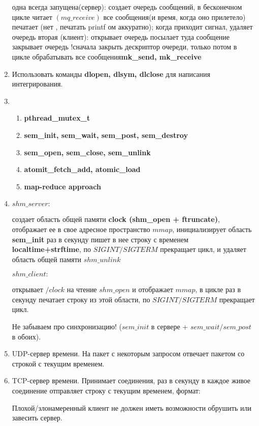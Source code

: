 \begin{enumerate}
одна всегда запущена(сервер):
    создает очередь сообщений, 
    в бесконечном цикле читает $(mq\_receive)$ все сообщения(и время, когда оно прилетело)
    печатает (нет \0, печатать printf ом аккуратно); 
    когда приходит сигнал, удаляет очередь
вторая (клиент):
    открывает очередь
    посылает туда сообщение
    закрывает очередь
!сначала закрыть дескриптор очереди, только потом в цикле обрабатывать все сообщения\textbf{mk\_send, mk\_receive} 
    \item Использовать команды \textbf{dlopen, dlsym, dlclose} для написания интегрирования. 
    \item 
        \begin{enumerate}
            \item \textbf{pthread\_mutex\_t} 
            \item \textbf{sem\_init, sem\_wait, sem\_post, sem\_destroy} 
            \item \textbf{sem\_open, sem\_close, sem\_unlink}
            \item \textbf{atomit\_fetch\_add, atomic\_load}
            \item \textbf{map-reduce approach} 
        \end{enumerate}
    \item $shm\_server:$ 
    
    создает область общей памяти \textbf{clock (shm\_open + ftruncate)}, отображает ее в свое адресное пространство $mmap$, инициализирует область \textbf{sem\_init} 
    раз в секунду пишет в нее строку с временем \textbf{localtime+strftime}, 
    по $SIGINT/SIGTERM$  прекращает цикл, и удаляет область общей памяти $shm\_unlink$
    
    $shm\_client:$ 
    
    открывает $/clock$ на чтение $shm\_open$ и отображает $mmap$, в цикле раз в секунду печатает строку из этой области, по $SIGINT/SIGTERM$ прекращает цикл. 
    
    Не забываем про синхронизацию! ($sem\_init$ в сервере + $sem\_wait/sem\_post$ в обоих).
    
    \item  UDP-сервер времени.
На пакет с некоторым запросом отвечает пакетом со строкой с текущим временем.  

    \item  TCP-сервер времени.
Принимает соединения, раз в секунду в каждое живое соединение отправляет
строку с текущим временем, формат: %

Плохой/злонамеренный клиент не должен иметь возможности обрушить или завесить сервер.  
    

\end{enumerate}